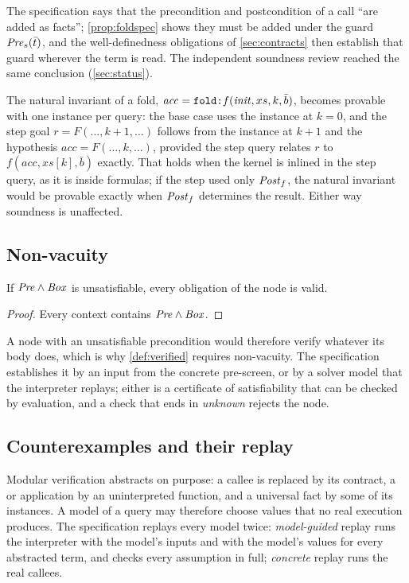 The specification says that the precondition and postcondition of a  call ``are added
as facts''; \cref{prop:foldspec} shows they must be added under the guard $\mathit{Pre}_s(\bar t)$, and
the well-definedness obligations of \cref{sec:contracts} then establish that guard wherever
the term is read. The independent soundness review reached the same conclusion
(\cref{sec:status}).

The natural invariant of a fold, $\mathit{acc}=\texttt{fold:}f(\mathit{init},xs,k,\bar b)$,
becomes provable with one instance per query: the base case uses the instance at $k=0$, and the
step goal $r=F(\dots,k+1,\dots)$ follows from the instance at $k+1$ and the hypothesis
$\mathit{acc}=F(\dots,k,\dots)$, provided the step query relates $r$ to
$f(\mathit{acc},xs[k],\bar b)$ exactly. That holds when the kernel is inlined in the step query,
as it is inside formulas; if the step used only $\mathit{Post}_f$, the natural invariant would be
provable exactly when $\mathit{Post}_f$ determines the result. Either way soundness is unaffected.

\subsection{Non-vacuity}

\begin{lemma}[Ex falso]\label{lem:exfalso}
If $\mathit{Pre}\wedge\mathit{Box}$ is unsatisfiable, every obligation of the node is valid.
\end{lemma}
\begin{proof}
Every context contains $\mathit{Pre}\wedge\mathit{Box}$.
\end{proof}

A node with an unsatisfiable precondition would therefore verify whatever its body does, which
is why \cref{def:verified} requires non-vacuity. The specification establishes it by an input
from the concrete pre-screen, or by a solver model that the interpreter replays; either is a
certificate of satisfiability that can be checked by evaluation, and a check that ends in
\emph{unknown} rejects the node.

\subsection{Counterexamples and their replay}

Modular verification abstracts on purpose: a callee is replaced by its contract, a 
or  application by an uninterpreted function, and a universal fact by some of its
instances. A model of a query may therefore choose values that no real execution produces. The
specification replays every model twice: \emph{model-guided} replay runs the interpreter with
the model's inputs and with the model's values for every abstracted term, and checks every
assumption in full; \emph{concrete} replay runs the real callees.

